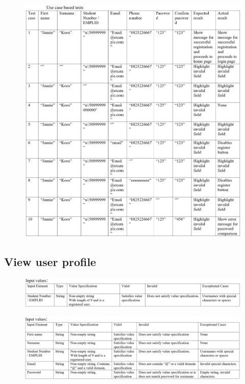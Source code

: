 \documentclass{article}
\begin{document}
\begin{figure}[ht!]
\hspace*{-2.5cm} 
\includegraphics[width=180mm]{7.png}
\end{figure}

\subsection{View user profile}
\begin{figure}[ht!]
\hspace*{-2.5cm} 
\includegraphics[width=180mm]{8.png}
\end{figure}

\begin{figure}[ht!]
\hspace*{-2.5cm} 
\includegraphics[width=180mm]{9.png}
\end{figure}
\end{document}

